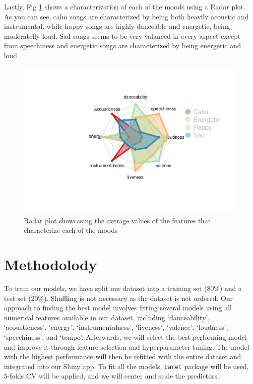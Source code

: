 \documentclass[11pt,]{article}
\begin{document}
Lastly, Fig \ref{fig:radar} shows a characterization of each of the
moods using a Radar plot. As you can see, calm songs are characterized
by being both heavily acoustic and instrumental, while happy songs are
highly danceable and energetic, being moderatelly loud. Sad songs seems
to be very valanced in every aspect except from speechiness and
energetic songs are characterized by being energetic and loud.

\begin{figure}[H]
\includegraphics{figs/radar} \caption{Radar plot showcasing the average values of the features that characterize each of the moods}\label{fig:radar}
\end{figure}

\hypertarget{methodolody}{%
\section{Methodolody}\label{methodolody}}

To train our models, we have split our dataset into a training set
(80\%) and a test set (20\%). Shuffling is not necessary as the dataset
is not ordered. Our approach to finding the best model involves fitting
several models using all numerical features available in our dataset,
including `danceability', `acousticness', `energy', `instrumentalness',
`liveness', `valence', `loudness', `speechiness', and `tempo'.
Afterwards, we will select the best performing model and improve it
through feature selection and hyperparameter tuning. The model with the
highest performance will then be refitted with the entire dataset and
integrated into our Shiny app. To fit all the models, \texttt{caret}
package \citep{caret} will be used, 5-folds CV will be applied, and we
will center and scale the predictors.
\end{document}
